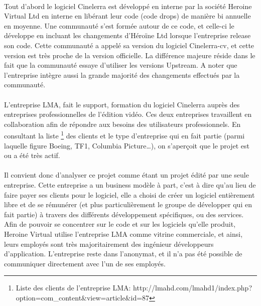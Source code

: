 \paragraph{}

Tout d'abord le logiciel Cinelerra est développé en interne par
la société Heroine Virtual Ltd en interne en libérant leur code
(code drops) de manière bi annuelle en moyenne. Une communauté s'est
formée autour de ce code, et celle-ci le développe en incluant les
changements d'Héroïne Ltd lorsque l'entreprise release son code. Cette
communauté a appelé sa version du logiciel Cinelerra-cv, et cette
version est très proche de la version officielle. La différence majeure
réside dans le fait que la communauté essaye d'utiliser les versions
Upstream. A noter que l'entreprise intègre aussi la grande majorité
des changements effectués par la communauté.

\paragraph{}

L'entreprise LMA, fait le support, formation du logiciel Cinelerra
auprès des entreprises professionnelles de l'édition vidéo. Ces deux
entreprises travaillent en collaboration afin de répondre aux besoins
des utilisateurs professionnels. En consultant la liste \footnote{Liste
des clients de l'entreprise LMA:
  http://lmahd.com/lmahd1/index.php?option=com\_content\&view=article\&id=87}
des clients et le type d'entreprise qui en fait partie (parmi laquelle
figure Boeing, TF1, Columbia Picture\ldots), on s'aperçoit que le projet
est ou a été très actif.

\paragraph{}

Il convient donc d'analyser ce projet comme étant un projet édité par
une seule entreprise. Cette entreprise a un business modèle à part,
c'est à dire qu'au lieu de faire payer ses clients pour le logiciel, elle
a choisi de créer un logiciel entièrement libre et de se rémunérer
(et plus particulièrement le groupe de développer qui en fait partie) à
travers des différents développement spécifiques, ou des services. Afin
de pouvoir se concentrer sur le code et sur les logiciels qu'elle produit,
Heroine Virtual utilise l'entreprise LMA comme vitrine commerciale,
et ainsi, leurs employés sont très majoritairement des ingénieur
développeurs d'application.  L'entreprise reste dans l'anonymat,
et il n'a pas été possible de communiquer directement avec l'un de
ses employés.

